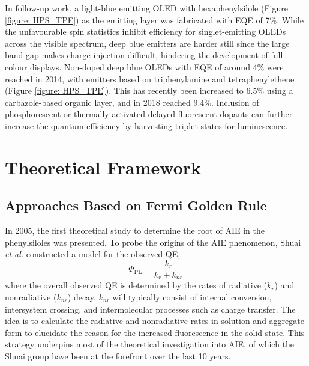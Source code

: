 In follow-up work, a light-blue emitting \ac{OLED} with hexaphenylsilole (Figure \ref{figure: HPS_TPE}) as the emitting layer was fabricated with \ac{EQE} of 7\%.\cite{Chen2003} While the unfavourable spin statistics inhibit efficiency for singlet-emitting \acp{OLED} across the visible spectrum, deep blue emitters are harder still since the large band gap makes charge injection difficult, hindering the development of full colour displays. Non-doped deep blue \acp{OLED} with \ac{EQE} of around 4\% were reached in 2014, with emitters based on triphenylamine and tetraphenylethene (Figure \ref{figure: HPS_TPE}).\cite{Huang2014,Huang2014a} This has recently been increased to 6.5\% using a carbazole-based organic layer, and in 2018 reached 9.4\%.\cite{KumarKonidena2017,Tang2018} Inclusion of phosphorescent or thermally-activated delayed fluorescent dopants can further increase the quantum efficiency by harvesting triplet states for luminescence.\cite{Zhu2018}

\section{Theoretical Framework}\label{section: lom theory}
\subsection{Approaches Based on Fermi Golden Rule}\label{section: lom FGR}
In 2005, the first theoretical study to determine the root of AIE in the phenylsiloles was presented.\cite{Yui2005} To probe the origins of the AIE phenomenon, Shuai \textit{et al.} constructed a model for the observed \ac{QE}, 
\begin{equation}\label{equation: QE}
    \Phi_{\mathrm{PL}}=\frac{k_{r}}{k_{r}+k_{nr}}
\end{equation}
where the overall observed \ac{QE} is determined by the rates of radiative ($k_{r}$) and nonradiative ($k_{nr}$) decay. $k_{nr}$ will typically consist of internal conversion, intersystem crossing, and intermolecular processes such as charge transfer. The idea is to calculate the radiative and nonradiative rates in solution and aggregate form to elucidate the reason for the increased fluorescence in the solid state. This strategy underpins most of the theoretical investigation into AIE, of which the Shuai group have been at the forefront over the last 10 years. 

